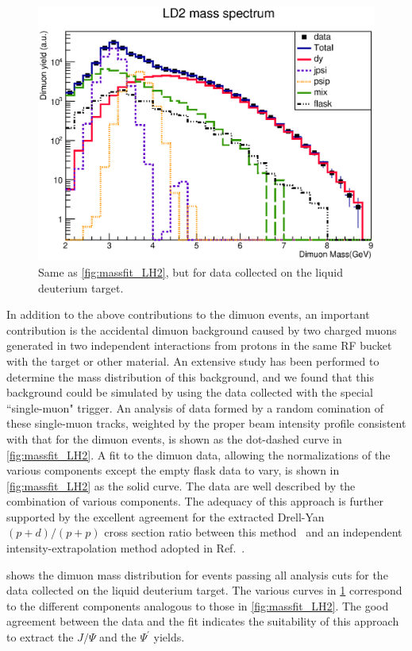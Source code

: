 \documentclass[reprint,aps,unsortedaddress,superscriptaddress,prd,floatfix,showpacs,linenumbers]{revtex4-2}
\begin{document}
\begin{figure}
	\includegraphics[width=\linewidth]{massFit/LD2_massfit}
	\caption{Same as \cref{fig:massfit_LH2}, but for data collected on the liquid
		deuterium target.}
	\label{fig:massfit_LD2}
\end{figure}

In addition to the above contributions to the dimuon events, an important
contribution is the accidental dimuon background caused by two charged 
muons generated in two independent interactions from protons in the same 
RF bucket with the target or other material. An extensive
study has been performed to determine the mass distribution of this background,
and we found that this background could be simulated by using
the data collected with the special ``single-muon" trigger. An analysis
of data formed by a random 
comination of these single-muon tracks, weighted by the proper beam intensity
profile consistent with that for the dimuon events, is shown as the dot-dashed
curve in \cref{fig:massfit_LH2}. A fit to the dimuon data, allowing the normalizations of
the various components except the empty flask data to vary, is shown in \cref{fig:massfit_LH2}
as the solid curve. The data are well described by the combination of various
components. The adequacy of this approach is further supported by the excellent
agreement for the extracted Drell-Yan $(p+d) / (p+p)$ cross section ratio 
between this method~\cite{dove2023} and an independent intensity-extrapolation
method adopted in Ref.~\cite{dove2021}.

 shows the dimuon mass distribution for events passing all analysis
cuts for the data collected on the liquid deuterium target. The various curves
in \cref{fig:massfit_LD2} correspond to the different components analogous to those in \cref{fig:massfit_LH2}.
The good agreement between the data and the fit indicates the suitability of
this approach to extract the $J/\Psi$ and the $\Psi^\prime$ yields. 
\end{document}
